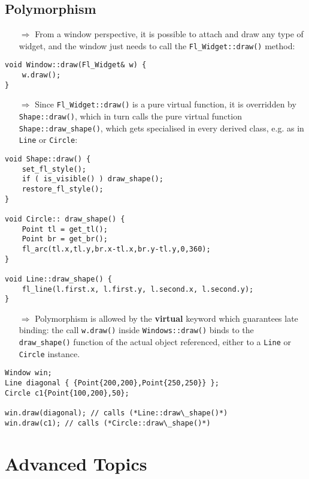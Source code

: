 \documentclass[10pt]{book}
\begin{document}
\section{Polymorphism}
\begin{enumerate}
\item[$\Rightarrow$] From a window perspective, it is possible to attach and draw any type of widget, and the window just needs to call the \texttt{Fl\_Widget::draw()} method:
\end{enumerate}
\begin{lstlisting}
void Window::draw(Fl_Widget& w) {
    w.draw();
}
\end{lstlisting}
\begin{enumerate}
\item[$\Rightarrow$] Since \texttt{Fl\_Widget::draw()} is a pure virtual function, it is overridden by
\texttt{Shape::draw()}, which in turn calls the pure virtual function \texttt{Shape::draw\_shape()}, which gets specialised in every derived class, e.g. as in \texttt{Line} or \texttt{Circle}:
\end{enumerate}
\begin{lstlisting}
void Shape::draw() {
    set_fl_style();
    if ( is_visible() ) draw_shape();
    restore_fl_style();
}

void Circle:: draw_shape() {
    Point tl = get_tl();
    Point br = get_br();
    fl_arc(tl.x,tl.y,br.x-tl.x,br.y-tl.y,0,360);
}

void Line::draw_shape() {
    fl_line(l.first.x, l.first.y, l.second.x, l.second.y);
}
\end{lstlisting}
\begin{enumerate}
\item[$\Rightarrow$] Polymorphism is allowed by the \textbf{virtual} keyword which guarantees late binding: the call \texttt{w.draw()} inside \texttt{Windows::draw()} binds to the \texttt{draw\_shape()} function of the actual object referenced, either to a \texttt{Line} or \texttt{Circle} instance.
\end{enumerate}
\begin{lstlisting}
Window win;
Line diagonal { {Point{200,200},Point{250,250}} };
Circle c1{Point{100,200},50};

win.draw(diagonal); // calls (*Line::draw\_shape()*)
win.draw(c1); // calls (*Circle::draw\_shape()*)
\end{lstlisting}
%
%
\chapter{Advanced Topics}
%
%
\end{document}

